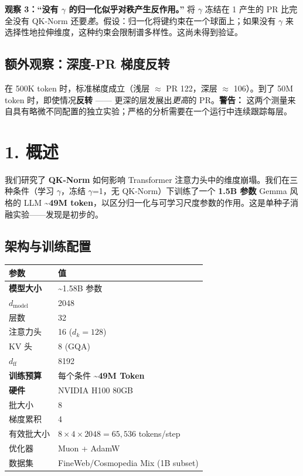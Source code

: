 \documentclass[11pt]{ctexart}
\begin{document}
\begin{tcolorbox}[colback=gray!10, colframe=gray!50, arc=2mm, boxrule=0.5pt]
\textbf{观察 3：“没有 $\gamma$ 的归一化似乎对秩产生反作用。”} 将 $\gamma$ 冻结在 1 产生的 PR 比完全没有 QK-Norm 还要\textit{差}。假设：归一化将键约束在一个球面上；如果没有 $\gamma$ 来选择性地拉伸维度，这种约束会限制谱多样性。这尚未得到验证。
\end{tcolorbox}

\subsection{额外观察：深度-PR 梯度反转}

\begin{tcolorbox}[colback=gray!10, colframe=gray!50, arc=2mm, boxrule=0.5pt]
在 500K token 时，标准梯度成立（浅层 $\approx$ PR 122，深层 $\approx$ 106）。到了 50M token 时，即使情况\textbf{反转} —— 更深的层发展出\textit{更高}的 PR。\textbf{警告：} 这两个测量来自具有略微不同配置的独立实验；严格的分析需要在一个运行中连续跟踪每层。
\end{tcolorbox}

\section{1. 概述}

我们研究了 \textbf{QK-Norm} 如何影响 Transformer 注意力头中的维度崩塌。我们在三种条件（学习 $\gamma$，冻结 $\gamma$=1，无 QK-Norm）下训练了一个 \textbf{1.5B 参数} Gemma 风格的 LLM \textbf{\textasciitilde49M token}，以区分归一化与可学习尺度参数的作用。这是单种子消融实验——发现是初步的。

\subsection{架构与训练配置}

\begin{table}[h!]
\centering
\begin{tabular}{ll}
\toprule
\textbf{参数} & \textbf{值} \\
\midrule
\textbf{模型大小} & \textasciitilde1.58B 参数 \\
$d_\text{model}$ & 2048 \\
层数 & 32 \\
注意力头 & 16 ($d_k = 128$) \\
KV 头 & 8 (GQA) \\
$d_\text{ff}$ & 8192 \\
\textbf{训练预算} & 每个条件 \textbf{\textasciitilde49M Token} \\
\textbf{硬件} & NVIDIA H100 80GB \\
批大小 & 8 \\
梯度累积 & 4 \\
有效批大小 & $8 \times 4 \times 2048 = 65{,}536$ tokens/step \\
优化器 & Muon + AdamW \\
数据集 & FineWeb/Cosmopedia Mix (1B subset) \\
\bottomrule
\end{tabular}
\end{table}
\end{document}
